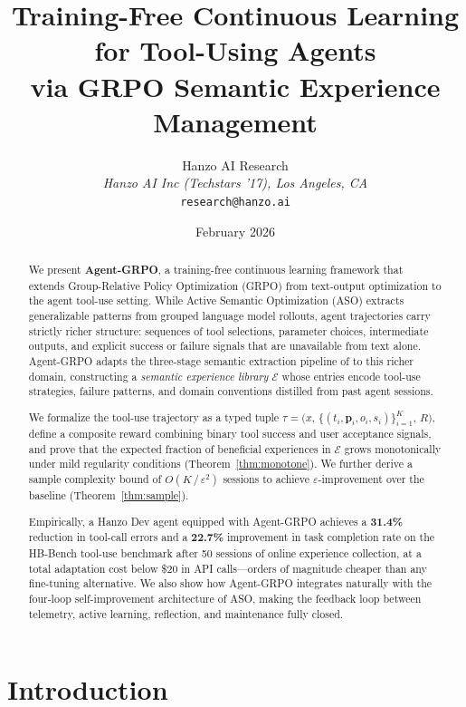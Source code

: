 \documentclass[11pt]{article}
\title{Training-Free Continuous Learning for Tool-Using Agents\\
via GRPO Semantic Experience Management}
\author{
    Hanzo AI Research\\
    \textit{Hanzo AI Inc (Techstars '17), Los Angeles, CA}\\
    \texttt{research@hanzo.ai}
}
\date{February 2026}
\begin{document}
\luxcoverpage

\begin{abstract}
We present \textbf{Agent-GRPO}, a training-free continuous learning framework
that extends Group-Relative Policy Optimization (GRPO) from text-output
optimization to the agent tool-use setting. While Active Semantic Optimization
(ASO) extracts generalizable patterns from grouped language model rollouts,
agent trajectories carry strictly richer structure: sequences of tool
selections, parameter choices, intermediate outputs, and explicit success or
failure signals that are unavailable from text alone. Agent-GRPO adapts the
three-stage semantic extraction pipeline of \cite{tencent2025youtoagent} to
this richer domain, constructing a \emph{semantic experience library}
$\mathcal{E}$ whose entries encode tool-use strategies, failure patterns, and
domain conventions distilled from past agent sessions.

We formalize the tool-use trajectory as a typed tuple
$\tau = \bigl(x,\,\{(t_i, \bm{p}_i, o_i, s_i)\}_{i=1}^K,\, R\bigr)$, define
a composite reward combining binary tool success and user acceptance signals,
and prove that the expected fraction of beneficial experiences in $\mathcal{E}$
grows monotonically under mild regularity conditions (Theorem~\ref{thm:monotone}).
We further derive a sample complexity bound of $O(K\,/\,\varepsilon^2)$ sessions
to achieve $\varepsilon$-improvement over the baseline (Theorem~\ref{thm:sample}).

Empirically, a Hanzo Dev agent equipped with Agent-GRPO achieves a
\textbf{31.4\%} reduction in tool-call errors and a \textbf{22.7\%} improvement
in task completion rate on the HB-Bench tool-use benchmark after 50 sessions of
online experience collection, at a total adaptation cost below \$20 in API
calls---orders of magnitude cheaper than any fine-tuning alternative. We also
show how Agent-GRPO integrates naturally with the four-loop self-improvement
architecture of ASO, making the feedback loop between telemetry, active
learning, reflection, and maintenance fully closed.
\end{abstract}

\section{Introduction}
\label{sec:intro}
\end{document}
